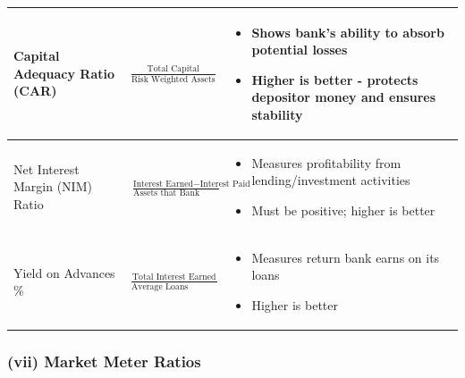\documentclass[12pt]{article}
\begin{document}
\begin{longtable}{|>{\raggedright\arraybackslash}m{4.5cm}|>{\raggedright\arraybackslash}m{5cm}|>{\raggedright\arraybackslash}m{6cm}|}
Capital Adequacy Ratio (CAR) & 
$\frac{\text{Total Capital}}{\text{Risk Weighted Assets}}$ &
\begin{itemize}
\item Shows bank's ability to absorb potential losses
\item Higher is better - protects depositor money and ensures stability
\end{itemize} \\
\hline

Net Interest Margin (NIM) Ratio & 
$\frac{\text{Interest Earned} - \text{Interest Paid}}{\text{Assets that Bank Holds}}$ &
\begin{itemize}
\item Measures profitability from lending/investment activities
\item Must be positive; higher is better
\end{itemize} \\
\hline

Yield on Advances \% & 
$\frac{\text{Total Interest Earned}}{\text{Average Loans \& Advances}}$ &
\begin{itemize}
\item Measures return bank earns on its loans
\item Higher is better
\end{itemize} \\
\hline
\end{longtable}

\subsubsection*{(vii) Market Meter Ratios}
\end{document}
